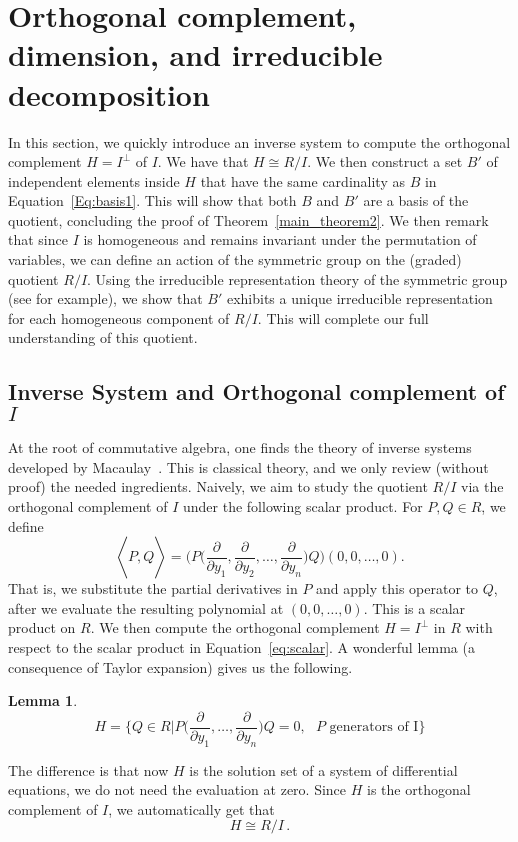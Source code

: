 \documentclass[10pt,a4paper]{article}
\newtheorem{lemma}{Lemma}[section]
\DeclareMathOperator{\la}{\langle}
\DeclareMathOperator{\ra}{\rangle}
\begin{document}
\section{Orthogonal complement, dimension, and irreducible decomposition}\label{sec:irreducible}
In this section, we quickly introduce an inverse system to compute the orthogonal complement $H=I^\perp$ of $I$.
We have that $H\cong R/I$.
We then construct a set $B'$ of independent elements inside  $H$ that have the same cardinality as $B$ in Equation~\eqref{Eq:basis1}.
This will show that both $B$ and $B'$ are a basis of the  quotient, concluding the proof of Theorem~\ref{main_theorem2}.
 We then remark that  since $I$ is homogeneous and remains invariant under the permutation of variables, we can define an action of the symmetric group on the (graded) quotient $R/I$. Using the  irreducible representation theory of the symmetric group (see \cite{Sagan} for example), we show that $B'$  exhibits a unique irreducible representation for each homogeneous component of $R/I$. This will complete our full understanding of this quotient.


\subsection{Inverse System and Orthogonal complement of $I$}\label{sec:inverse}
At the root of commutative algebra, one finds the theory of inverse systems developed by Macaulay~\cite{Macaulay}. This is classical theory, and we
only review (without proof) the needed ingredients.
Naively, we aim to study the quotient $R/I$ via the orthogonal complement of $I$ under the following scalar product.
For $P,Q\in R$, we define
 \begin{equation}\label{eq:scalar}
     \la P, Q \ra = \Big( P\big({\textstyle \frac{ \partial}{ \partial y_1},\frac{ \partial}{ \partial y_2},\ldots,\frac{ \partial}{ \partial y_n}}\big) Q\Big)(0,0,\ldots,0).
   \end{equation}
That is, we substitute the partial derivatives in $P$ and apply this operator to $Q$, after we evaluate the resulting polynomial at $(0,0,\ldots,0)$.
This is a scalar product on $R$. We then compute the orthogonal complement $H=I^\perp$ in $R$ with respect to the scalar product in Equation~\eqref{eq:scalar}.
A wonderful lemma (a consequence of Taylor expansion) gives us the following.
\begin{lemma}\label{lem:ortho}
  $$H = \big\{ Q \in R\big| P\big({\textstyle \frac{ \partial}{ \partial y_1},\ldots,\frac{ \partial}{ \partial y_n}}\big) Q =0, \text{ $P$ generators of I}\big\}$$
  \end{lemma}
 The difference is that now $H$ is the solution set of a system of differential equations, we do not need the evaluation at zero. Since $H$ is the orthogonal complement
 of $I$, we automatically get that
 $$ H \cong R/I\,.$$
 
\end{document}
